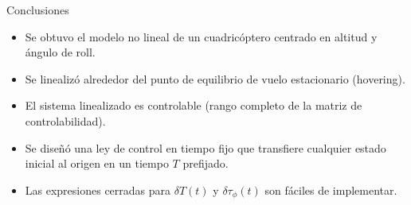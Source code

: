 \documentclass{beamer}
\begin{document}
\begin{frame}{Conclusiones}
\begin{itemize}
    \item Se obtuvo el modelo no lineal de un cuadricóptero centrado en altitud y ángulo de roll.
    \item Se linealizó alrededor del punto de equilibrio de vuelo estacionario (hovering).
    \item El sistema linealizado es controlable (rango completo de la matriz de controlabilidad).
    \item Se diseñó una ley de control en tiempo fijo que transfiere cualquier estado inicial al origen en un tiempo $T$ prefijado.
    \item Las expresiones cerradas para $\delta T(t)$ y $\delta\tau_\phi(t)$ son fáciles de implementar.
\end{itemize}
\end{frame}
\end{document}
